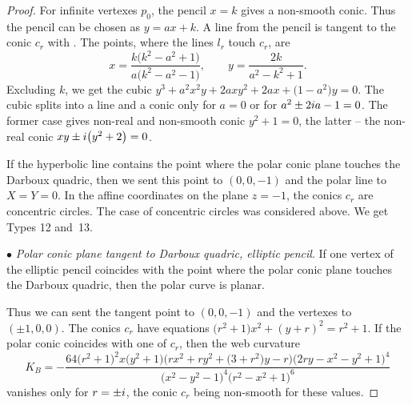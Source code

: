 \documentclass[11pt]{article}
\numberwithin{equation}{section}
\numberwithin{equation}{section}
\begin{document}
\begin{proof}
For infinite vertexes $p_0$, the pencil $x=k$ gives a non-smooth conic. Thus the pencil can be chosen as $y=ax+k$. A line from the pencil is tangent to the conic $c_r$ with
.
 The points, where the lines $l_r$ touch $c_r$, are
\[
x=\frac{k\bigl(k^2 -a^2+1\bigr)}{a\bigl(k^2-a^2-1\bigr)}, \qquad y=\frac{2k}{a^2 - k^2 + 1}.
\]
Excluding $k$, we get the cubic
$
y^3+a^2x^2y+2axy^2+2ax+\bigl(1-a^2\bigr)y=0$.
The cubic splits into a line and a conic only for $a=0$ or for $a^2 \pm 2{\rm i}a -1=0$. The former case gives non-real and non-smooth conic $y^2+1=0$, the latter -- the non-real conic $xy \pm {\rm i} \bigl(y^2+2\bigr)=0$.

 If the hyperbolic line contains the point where the polar conic plane touches the Darboux quadric, then we sent this point to $(0,0,-1)$ and the polar line to $X=Y=0$. In the affine coordinates on the plane $z=-1$, the conics $c_r$ are concentric circles. The case of concentric circles was considered above. We get Types 12 and~13.


$\bullet$ {\it Polar conic plane tangent to Darboux quadric, elliptic pencil}.
If one vertex of the elliptic pencil coincides with the point where the polar conic plane touches the Darboux quadric, then the polar curve is planar.

Thus we can sent the tangent point to $(0,0,-1)$ and the vertexes to $(\pm 1,0,0)$. The conics $c_r$ have equations
$
\bigl(r^2 + 1\bigr)x^2 + (y+r)^2 = r^2+1$.
If the polar conic coincides with one of $c_r$, then the web curvature
\[
K_B=-\frac{64\bigl(r^2 + 1\bigr)^2x\bigl(y^2 + 1\bigr)\bigl( rx^2 + ry^2+ \bigl(3+r^2\bigr)y - r \bigr)\bigl(2ry - x^2 - y^2 + 1\bigr)^4}{\bigl(x^2 - y^2 - 1\bigr)^4\bigl(r^2 - x^2 + 1\bigr)^6}
\]
vanishes only for $r=\pm {\rm i}$, the conic $c_r$ being non-smooth for these values.


\end{proof}
\end{document}
